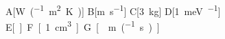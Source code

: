 \documentclass{article}
\begin{document}
A[\unit{\watt\per(\square\meter\kelvin)}]
B[\unit{\meter\per\second}]
C[\qty{3}{\kilo\gram}]
D[\SI{1}{\milli\electronvolt\per{}}]
E[\unit{\square{\kilo\meter}}]
F[\SI{1}{\cubic cm}]
G[\unit{\meter\per(\second)}]
\end{document}
